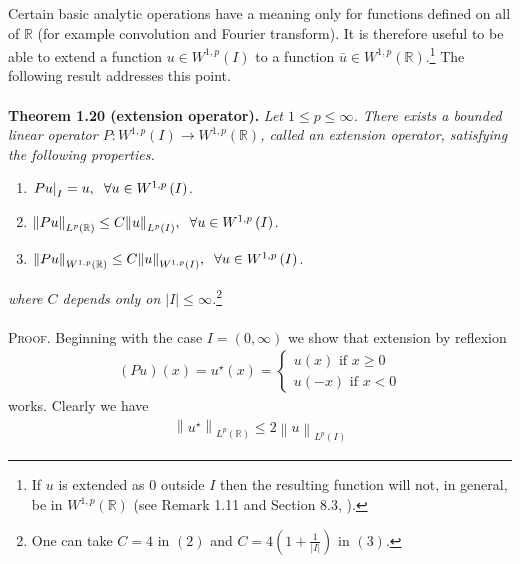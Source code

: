 \documentclass[a4paper,oneside]{book}
\numberwithin{equation}{chapter}
\begin{document}
Certain basic analytic operations have a meaning only for functions defined on all of $\mathbb{R}$ (for example convolution and Fourier transform). It is therefore useful to be able to extend a function $u\in W^{1,p}\left(I\right)$ to a function $\bar{u} \in W^{1,p} \left(\mathbb{R}\right)$.\footnote{If $u$ is extended as 0 outside $I$ then the resulting function will not, in general, be in $W^{1,p}\left(\mathbb{R}\right)$ (see Remark 1.11 and Section 8.3, \cite{1}).} The following result addresses this point.\\
\\
\textbf{Theorem 1.20 (extension operator).} \textit{Let $1\le p\le \infty$. There exists a bounded linear operator $P:{W^{1,p}}\left( I \right) \to {W^{1,p}}\left( \mathbb{R} \right)$, called an extension operator, satisfying the following properties.}
\begin{enumerate}
\item ${\left. {Pu} \right|_I} = u,\hspace{0.2cm}\forall u \in {W^{1,p}}\left( I \right)$.
\item ${\left\| {Pu} \right\|_{{L^p}\left( \mathbb{R} \right)}} \le C{\left\| u \right\|_{{L^p}\left( I \right)}},\hspace{0.2cm}\forall u \in {W^{1,p}}\left( I \right)$.
\item ${\left\| {Pu} \right\|_{{W^{1,p}}\left( \mathbb{R} \right)}} \le C{\left\| u \right\|_{{W^{1,p}}\left( I \right)}},\hspace{0.2cm}\forall u \in {W^{1,p}}\left( I \right)$.
\end{enumerate}
\textit{where $C$ depends only on $\left| I \right| \le \infty $.}\footnote{One can take $C=4$ in $\left(2\right)$ and $C = 4\left( {1 + \frac{1}{{\left| I \right|}}} \right)$ in $\left(3\right)$.}\\
\\
\textsc{Proof.} Beginning with the case $I=\left(0,\infty\right)$ we show that extension by reflexion
\begin{align}
\left( {Pu} \right)\left( x \right) = u^{\star}\left( x \right) = \left\{ {\begin{array}{*{20}{c}}
{u\left( x \right)\mbox{ if } x \ge 0}\\
{u\left( { - x} \right)\mbox{ if } x < 0}
\end{array}} \right.
\end{align}
works. Clearly we have
\begin{align}
\label{1.131}
{\left\| {u^{\star}} \right\|_{{L^p}\left( \mathbb{R} \right)}} \le 2{\left\| u \right\|_{{L^p}\left( I \right)}}
\end{align}
\end{document}
